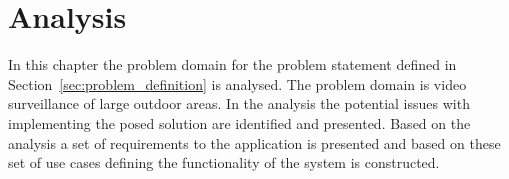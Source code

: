 \chapter{Analysis}
In this chapter the problem domain for the problem statement defined in Section~\ref{sec:problem_definition} is analysed.
The problem domain is video surveillance of large outdoor areas.
In the analysis the potential issues with implementing the posed solution are identified and presented.
Based on the analysis a set of requirements to the application is presented and based on these set of use cases defining the functionality of the system is constructed.





